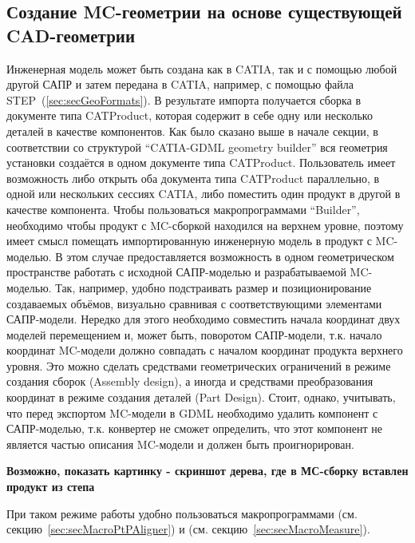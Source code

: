 \subsection{Создание MC-геометрии на основе существующей CAD-геометрии}\label{sec:secMCfromCAD}

Инженерная модель может быть создана как в CATIA, так и с помощью любой другой САПР и затем передана в CATIA, например, с помощью файла STEP~(\ref{sec:secGeoFormats}).
В результате импорта получается сборка в документе типа CATProduct, которая содержит в себе одну или несколько деталей в качестве компонентов.
Как было сказано выше в начале секции, в соответствии со структурой ``CATIA-GDML geometry builder'' вся геометрия установки создаётся в одном документе типа CATProduct. 
Пользователь имеет возможность либо открыть оба документа типа CATProduct параллельно, в одной или нескольких сессиях CATIA, либо поместить один продукт в другой в качестве компонента. Чтобы пользоваться макропрограммами ``Builder'', необходимо чтобы продукт с MC-сборкой находился на верхнем уровне, поэтому имеет смысл помещать импортированную инженерную модель в продукт с MC-моделью. В этом случае предоставляется возможность в одном геометрическом пространстве работать с исходной САПР-моделью и разрабатываемой MC-моделью. Так, например, удобно подстраивать размер и позиционирование создаваемых объёмов, визуально сравнивая с соответствующими элементами САПР-модели. Нередко для этого необходимо совместить начала координат двух моделей перемещением и, может быть, поворотом САПР-модели, т.к. начало координат MC-модели должно совпадать с началом координат продукта верхнего уровня. Это можно сделать средствами геометрических ограничений в режиме создания сборок (Assembly design), а иногда и средствами преобразования координат в режиме создания деталей (Part Design). Стоит, однако, учитывать, что перед экспортом MC-модели в GDML необходимо удалить компонент с САПР-моделью, т.к. конвертер  не сможет определить, что этот компонент не является частью описания MC-модели и должен быть проигнорирован.

\textbf{Возможно, показать картинку - скриншот дерева, где в МС-сборку вставлен продукт из степа}

При таком режиме работы удобно пользоваться макропрограммами  (см. секцию~\ref{sec:secMacroPtPAligner}) и  (см. секцию~\ref{sec:secMacroMeasure}).

%                                                    

